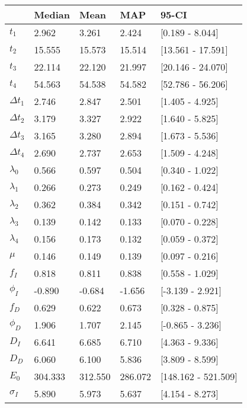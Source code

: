 \begin{tabular}{lllll}
\toprule
{} &   Median &     Mean &      MAP &                95-CI \\
\midrule
$t_1$        &    2.962 &    3.261 &    2.424 &      [0.189 - 8.044] \\
$t_2$        &   15.555 &   15.573 &   15.514 &    [13.561 - 17.591] \\
$t_3$        &   22.114 &   22.120 &   21.997 &    [20.146 - 24.070] \\
$t_4$        &   54.563 &   54.538 &   54.582 &    [52.786 - 56.206] \\
$\Delta t_1$ &    2.746 &    2.847 &    2.501 &      [1.405 - 4.925] \\
$\Delta t_2$ &    3.179 &    3.327 &    2.922 &      [1.640 - 5.825] \\
$\Delta t_3$ &    3.165 &    3.280 &    2.894 &      [1.673 - 5.536] \\
$\Delta t_4$ &    2.690 &    2.737 &    2.653 &      [1.509 - 4.248] \\
$\lambda_0$  &    0.566 &    0.597 &    0.504 &      [0.340 - 1.022] \\
$\lambda_1$  &    0.266 &    0.273 &    0.249 &      [0.162 - 0.424] \\
$\lambda_2$  &    0.362 &    0.384 &    0.342 &      [0.151 - 0.742] \\
$\lambda_3$  &    0.139 &    0.142 &    0.133 &      [0.070 - 0.228] \\
$\lambda_4$  &    0.156 &    0.173 &    0.132 &      [0.059 - 0.372] \\
$\mu$        &    0.146 &    0.149 &    0.139 &      [0.097 - 0.216] \\
$f_I$        &    0.818 &    0.811 &    0.838 &      [0.558 - 1.029] \\
$\phi_I$     &   -0.890 &   -0.684 &   -1.656 &     [-3.139 - 2.921] \\
$f_D$        &    0.629 &    0.622 &    0.673 &      [0.328 - 0.875] \\
$\phi_D$     &    1.906 &    1.707 &    2.145 &     [-0.865 - 3.236] \\
$D_I$        &    6.641 &    6.685 &    6.710 &      [4.363 - 9.336] \\
$D_D$        &    6.060 &    6.100 &    5.836 &      [3.809 - 8.599] \\
$E_0$        &  304.333 &  312.550 &  286.072 &  [148.162 - 521.509] \\
$\sigma_I$   &    5.890 &    5.973 &    5.637 &      [4.154 - 8.273] \\

\end{tabular}
